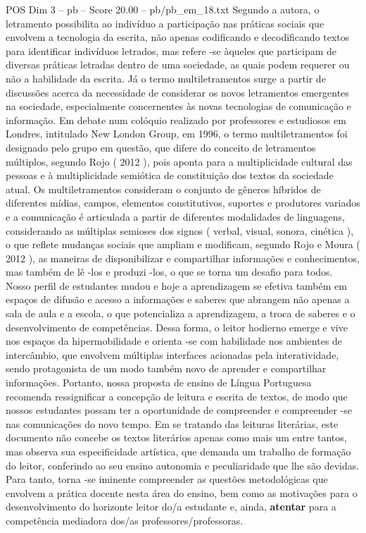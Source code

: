 \begin{textsample}{POS Dim 3 – pb – Score 20.00 – pb/pb\_em\_18.txt}
Segundo a autora, o letramento possibilita ao indivíduo a participação nas práticas sociais que envolvem a tecnologia da escrita, não apenas codificando e decodificando textos para identificar indivíduos letrados, mas refere -se àqueles que participam de diversas práticas letradas dentro de uma sociedade, as quais podem requerer ou não a habilidade da escrita.
Já o termo multiletramentos surge a partir de discussões acerca da necessidade de considerar os novos letramentos emergentes na sociedade, especialmente concernentes às novas tecnologias de comunicação e informação.
Em debate num colóquio realizado por professores e estudiosos em Londres, intitulado New London Group, em 1996, o termo multiletramentos foi designado pelo grupo em questão, que difere do conceito de letramentos múltiplos, segundo Rojo ( 2012 ), pois aponta para a multiplicidade cultural das pessoas e à multiplicidade semiótica de constituição dos textos da sociedade atual.
Os multiletramentos consideram o conjunto de gêneros híbridos de diferentes mídias, campos, elementos constitutivos, suportes e produtores variados e a comunicação é articulada a partir de diferentes modalidades de linguagens, considerando as múltiplas semioses dos signos ( verbal, visual, sonora, cinética ), o que reflete mudanças sociais que ampliam e modificam, segundo Rojo e Moura ( 2012 ), as maneiras de disponibilizar e compartilhar informações e conhecimentos, mas também de lê -los e produzi -los, o que se torna um desafio para todos.
Nosso perfil de estudantes mudou e hoje a aprendizagem se efetiva também em espaços de difusão e acesso a informações e saberes que abrangem não apenas a sala de aula e a escola, o que potencializa a aprendizagem, a troca de saberes e o desenvolvimento de competências.
Dessa forma, o leitor hodierno emerge e vive nos espaços da hipermobilidade e orienta -se com habilidade nos ambientes de intercâmbio, que envolvem múltiplas interfaces acionadas pela interatividade, sendo protagonista de um modo também novo de aprender e compartilhar informações.
Portanto, nossa proposta de ensino de Língua Portuguesa recomenda ressignificar a concepção de leitura e escrita de textos, de modo que nossos estudantes possam ter a oportunidade de compreender e compreender -se nas comunicações do novo tempo.
Em se tratando das leituras literárias, este documento não concebe os textos literários apenas como mais um entre tantos, mas observa sua especificidade artística, que demanda um trabalho de formação do leitor, conferindo ao seu ensino autonomia e peculiaridade que lhe são devidas.
Para tanto, torna -se iminente compreender as questões metodológicas que envolvem a prática docente nesta área do ensino, bem como as motivações para o desenvolvimento do horizonte leitor do/a estudante e, ainda, \textbf{atentar} para a competência mediadora dos/as professores/professoras.

\end{textsample}
